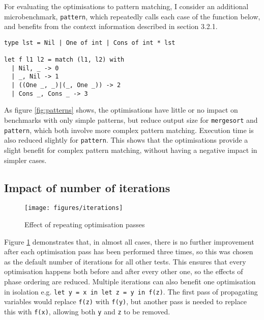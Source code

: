 For evaluating the optimisations to pattern matching, I consider an additional microbenchmark, \verb|pattern|, which repeatedly calls each case of the function below, and benefits from the context information described in section 3.2.1.
\begin{verbatim}
type lst = Nil | One of int | Cons of int * lst

let f l1 l2 = match (l1, l2) with
  | Nil, _ -> 0
  | _, Nil -> 1
  | ((One _, _)|(_, One _)) -> 2
  | Cons _, Cons _ -> 3
\end{verbatim}


As figure \ref{fig:patterns} shows, the optimisations have little or no impact on benchmarks with only simple patterns, but reduce output size for \verb|mergesort| and \verb|pattern|, which both involve more complex pattern matching. Execution time is also reduced slightly for \verb|pattern|.
This shows that the optimisations provide a slight benefit for complex pattern matching, without having a negative impact in simpler cases.


\subsection{Impact of number of iterations}
\vspace{-0.5cm}
\begin{figure}[H]
\hfill
\texttt{[image: figures/iterations]} \hfill
\vspace{-0.3cm}
\caption{Effect of repeating optimisation passes}
 \label{fig:iterations} 
\end{figure}

Figure \ref{fig:iterations} demonstrates that, in almost all cases, there is no further improvement after each optimisation pass has been performed three times, so this was chosen as the default number of iterations for all other tests. This ensures that every optimisation happens both before and after every other one, so the effects of phase ordering are reduced. %
Multiple iterations can also benefit one optimisation in isolation e.g. \verb|let y = x in let z = y in f(z)|. The first pass of propagating variables would replace \verb|f(z)| with \verb|f(y)|, but another pass is needed to replace this with \verb|f(x)|, allowing both \verb|y| and \verb|z| to be removed.

